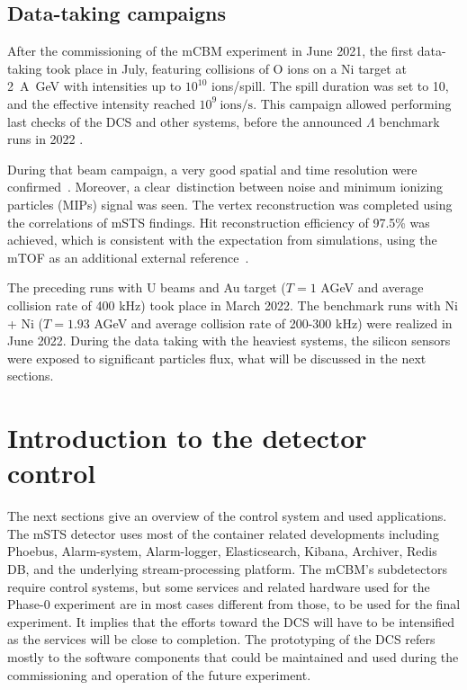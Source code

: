 \subsection{Data-taking campaigns}
After the commissioning of the \gls{mCBM} experiment in June \num{2021}, the first data-taking took place in July, featuring collisions of O ions on a Ni target at \SI{2}{\A\giga\eV} with intensities up to $10^{10}$ ions/spill. The spill duration was set to \SI{10}{\sec}, and the effective intensity reached $10^{9}~\mathrm{ions/s}$. This campaign allowed performing last checks of the \gls{DCS} and other systems, before the announced $\Lambda$ benchmark runs in 2022 \cite{sturm3}.

During that beam campaign, a very good spatial and time resolution were confirmed~\cite{dario1}. Moreover, a clear distinction between noise and minimum ionizing particles (\glspl{MIP}) signal was seen.
The vertex reconstruction was completed using the correlations of \gls{mSTS} findings. Hit reconstruction efficiency of 97.5\% was achieved, which is consistent with the expectation from simulations, using the mTOF as an additional external reference~\cite{dario1}.

The preceding runs with U beams and Au target ($T = 1$ AGeV and average collision rate of 400 kHz) took place in March 2022. The benchmark runs with Ni + Ni ($T = 1.93$ AGeV and average collision rate of 200-300 kHz) were realized in June 2022. During the data taking with the heaviest systems, the silicon sensors were exposed to significant particles flux, what will be discussed in the next sections. 
\section{Introduction to the detector control}
The next sections give an overview of the control system and used applications. The \gls{mSTS} detector uses most of the container related developments including Phoebus, Alarm-system, Alarm-logger, Elasticsearch, Kibana, Archiver, Redis \gls{DB}, and the underlying stream-processing platform. The mCBM's subdetectors require control systems, but some services and related hardware used for the Phase-0 experiment are in most cases different from those, to be used for the final experiment. It implies that the efforts toward the \gls{DCS} will have to be intensified as the services will be close to completion. The prototyping of the \gls{DCS} refers mostly to the software components that could be maintained and used during the commissioning and operation of the future experiment. 

